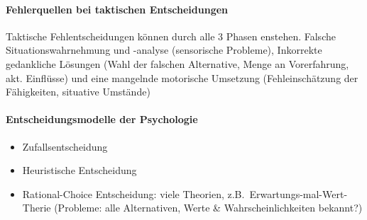 \paragraph{Fehlerquellen bei taktischen Entscheidungen} Taktische Fehlentscheidungen können durch alle 3 Phasen enstehen. Falsche Situationswahrnehmung und -analyse (sensorische Probleme), Inkorrekte gedankliche Lösungen (Wahl der falschen Alternative, Menge an Vorerfahrung, akt. Einflüsse) und eine mangelnde motorische Umsetzung (Fehleinschätzung der Fähigkeiten, situative Umstände)
\paragraph{Entscheidungsmodelle der Psychologie}
\begin{itemize}
  \item Zufallsentscheidung
  \item Heuristische Entscheidung
  \item Rational-Choice Entscheidung: viele Theorien, z.B.\ Erwartungs-mal-Wert-Therie (Probleme: alle Alternativen, Werte \& Wahrscheinlichkeiten bekannt?)
\end{itemize}
